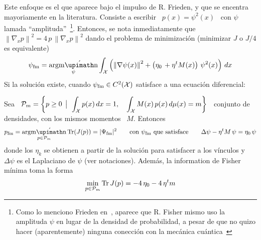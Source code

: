 Este enfoque es el que aparece bajo el impulso de R.  Frieden, y que se encentra
mayoriamente en la  literatura.  Consiste a escribir \ $p(x)  = \psi^2(x)$ \ con
$\psi$     lamada    ``amplituda''~\footnote{Como     lo    menciono     Frieden
en~\cite{FriSof95}, aparece que R. Fisher mismo uso la amplituda $\psi$ en lugar
de la  densidad de probabilidad, a  pesar de que no  quizo hacer (aparentemente)
ninguna conecci\'on con la  mec\'anica cu\'antica~\cite{Fis}}. Entonces, se nota
inmediatamente que $\left\|  \nabla_x p \right\|^2 = 4 \,  p \, \left\| \nabla_x
p \right\|^2$  dando el  problema de  minimizaci\'on (minimizar  $J$ o  $J/4$ es
equivalente)
%
\[
\psi_{\mathrm{fm}} = \argmin_\psi \int_\X  \left( \left\| \nabla \psi(x) \right\|^2 + \left( \eta_0 \,  
  + \eta^t M(x) \right) \, \psi^2(x) \right)  \, dx
\]
%
Si la soluci\'on existe, cuando $\psi_{\mathrm{fm}} \in C^2(\mathcal{X})$ satisface a una ecuaci\'on diferencial:
%
\begin{lema}
\label{Lem:SZ:MinFisher}
%
Sea  \  $\displaystyle  \mathcal{P}_m =  \left\{  p  \ge  0  \:\: \big| \:\:   \int_{\mathcal{X}} p(x)  \,  dx  =
  1,  \quad  \int_{\mathcal{X}} M(x)  \,  p(x)  \, d\mu(x)  =  m  \right\}$ \  conjunto  de
  densidades, con los mismos momentos \ $M$. Entonces
  \[
  p_{\mathrm{fm}} = \argmin_{p \in \P_m} \Tr(J(p)) = |\Psi_{\mathrm{fm}}|^2 \qquad  \mbox{con $\psi_{\mathrm{fm}}$ que satisface} \qquad 
%
\Delta \psi - \eta^t M \, \psi =  \eta_0 \, \psi
\]
%
donde los $\eta_k$ se obtienen a partir de la soluci\'on para satisfacer a los v\'inculos y $\Delta \psi$ es el Laplaciano
  de $\psi$ (ver notaciones). Adem\'as, la information de Fisher  m\'inima toma la forma
%
\[
\min_{p \in \mathcal{P}_m} \operatorname{Tr} J(p) = - 4 \, \eta_0 - 4 \, \eta^t m
\]
\end{lema}
%
